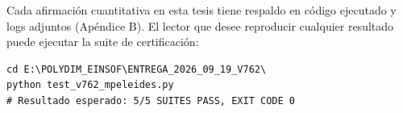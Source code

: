 Cada afirmación cuantitativa en esta tesis tiene respaldo en código ejecutado
y logs adjuntos (Apéndice B). El lector que desee reproducir cualquier resultado
puede ejecutar la suite de certificación:

\begin{lstlisting}[style=pythonstyle, caption={Comando de certificación V762}, label=lst:cert]
cd E:\POLYDIM_EINSOF\ENTREGA_2026_09_19_V762\
python test_v762_mpeleides.py
# Resultado esperado: 5/5 SUITES PASS, EXIT CODE 0
\end{lstlisting}
